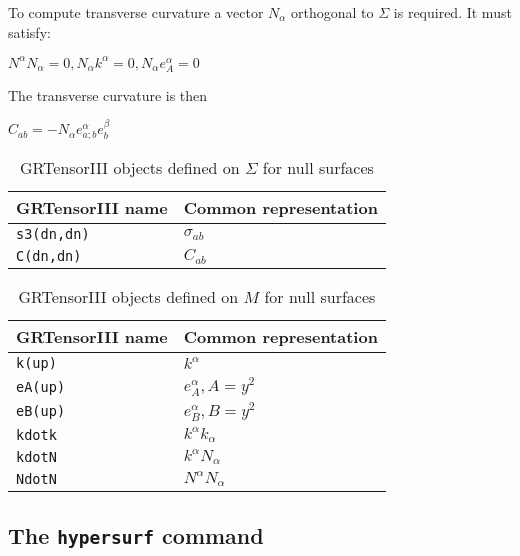 \documentclass{article}
\begin{document}
To compute transverse curvature a vector $N_\alpha$ orthogonal to $\Sigma$ is required. It must satisfy:
\begin{center}
$N^\alpha N_\alpha = 0, N_\alpha k^\alpha = 0, N_\alpha e^\alpha_A = 0$
\end{center}
The transverse curvature is then 
\begin{center}
$C_{ab} = - N_\alpha e^\alpha_{a;b} e^\beta_b$
\end{center}

\renewcommand{\arraystretch}{1.5}
\begin{table}[h]
  \begin{center}
    \begin{tabular}{ll}\hline\hline
      \textbf{GRTensorIII name} & \textbf{Common representation}\\ \hline
      \texttt{s3(dn,dn)}        & $\sigma_{ab} $  \\
      \texttt{C(dn,dn)}        & $C_{ab} $  \\
    \end{tabular}
    \caption{GRTensorIII objects defined on $\Sigma$ for null surfaces}
    \label{tab:null1}
  \end{center}
\end{table}

\begin{table}[ht]
  \begin{center}
    \begin{tabular}{ll}\hline\hline
      \textbf{GRTensorIII name} & \textbf{Common representation}\\ \hline
      \texttt{k(up)}        & $k^\alpha$  \\
      \texttt{eA(up)}        & $e^\alpha_{A}, A=y^2 $  \\
      \texttt{eB(up)}        & $e^\alpha_{B}, B=y^2 $  \\
      \texttt{kdotk}        & $k^\alpha k_\alpha$  \\
      \texttt{kdotN}        & $k^\alpha N_\alpha$  \\
      \texttt{NdotN}        & $N^\alpha N_\alpha$  \\
    \end{tabular}
    \caption{GRTensorIII objects defined on $M$ for null surfaces}
    \label{tab:null1}
  \end{center}
\end{table}


\FloatBarrier
\subsection{The \texttt{hypersurf} command}
\end{document}
